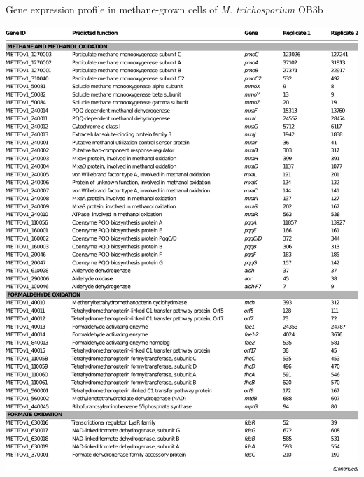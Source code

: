 \begin{table}[H]
\caption{Gene expression profile in methane-grown cells of \textit{M. trichosporium} OB3b}
\centering
     \includegraphics[width=1.0\textwidth]{./tex/chapter1/figures/matsen_OB3b_table2_piece1--cropped--no_header.pdf}
\label{table:OB3b_2}
\end{table}

